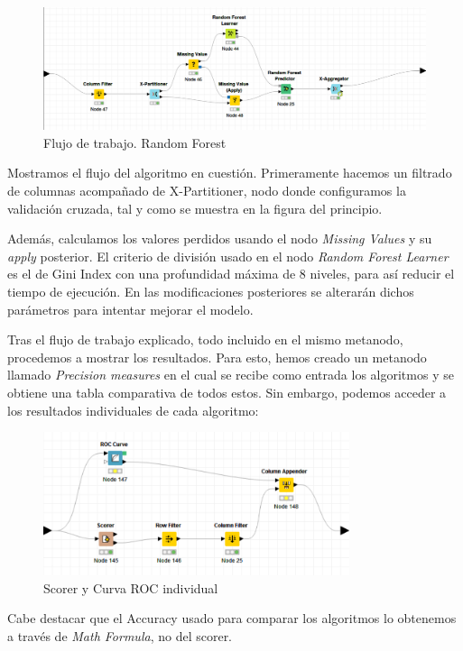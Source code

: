 	
	\begin{figure}[H]
	    \centering
		\includegraphics[width=1\textwidth]{img/randomforest.png}
		\caption{Flujo de trabajo. Random Forest}
	\end{figure}

	
	Mostramos el flujo del algoritmo en cuestión. Primeramente hacemos un filtrado de columnas acompañado de X-Partitioner, nodo donde configuramos la validación cruzada, tal y como se muestra en la figura del principio. 
	
	Además, calculamos los valores perdidos usando el nodo \textit{Missing Values} y su \textit{apply} posterior. El criterio de división usado en el nodo \textit{Random Forest Learner} es el de Gini Index con una profundidad máxima de 8 niveles, para así reducir el tiempo de ejecución. En las modificaciones posteriores se alterarán dichos parámetros para intentar mejorar el modelo.
	
	Tras el flujo de trabajo explicado, todo incluido en el mismo metanodo, procedemos a mostrar los resultados. Para esto, hemos creado un metanodo llamado \textit{Precision measures} en el cual se recibe como entrada los algoritmos y se obtiene una tabla comparativa de todos estos. Sin embargo, podemos acceder a los resultados individuales de cada algoritmo:
	
	\begin{figure}[H]
		\centering
		\includegraphics[width=0.8\textwidth]{img/resultados.png}
		\caption{Scorer y Curva ROC individual}
	\end{figure}
	
	Cabe destacar que el Accuracy usado para comparar los algoritmos lo obtenemos a través de \textit{Math Formula}, no del scorer.
	
